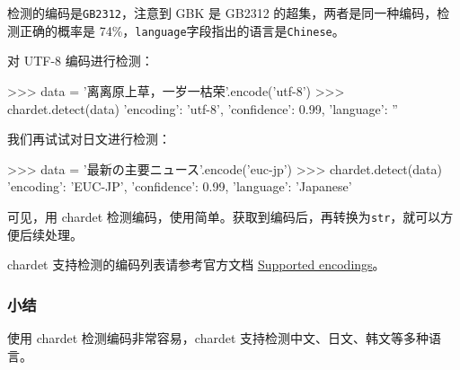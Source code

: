 检测的编码是\texttt{GB2312}，注意到 GBK 是 GB2312
的超集，两者是同一种编码，检测正确的概率是
74\%，\texttt{language}字段指出的语言是\texttt{\textquotesingle{}Chinese\textquotesingle{}}。

对 UTF-8 编码进行检测：

\begin{pythoncode}
>>> data = '离离原上草，一岁一枯荣'.encode('utf-8')
>>> chardet.detect(data)
{'encoding': 'utf-8', 'confidence': 0.99, 'language': ''}
\end{pythoncode}

我们再试试对日文进行检测：

\begin{pythoncode}
>>> data = '最新の主要ニュース'.encode('euc-jp')
>>> chardet.detect(data)
{'encoding': 'EUC-JP', 'confidence': 0.99, 'language': 'Japanese'}
\end{pythoncode}

可见，用 chardet
检测编码，使用简单。获取到编码后，再转换为\texttt{str}，就可以方便后续处理。

chardet 支持检测的编码列表请参考官方文档
\href{https://chardet.readthedocs.io/en/latest/supported-encodings.html}{Supported
encodings}。

\hypertarget{ux5c0fux7ed3}{%
\subsubsection{小结}\label{ux5c0fux7ed3}}

使用 chardet 检测编码非常容易，chardet
支持检测中文、日文、韩文等多种语言。

